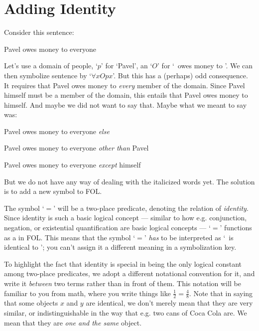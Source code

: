 \section{Adding Identity}\label{s:identity}


Consider this sentence:
\begin{earg}
\item[\ex{else1}] Pavel owes money to everyone
\end{earg}
Let's use a domain of people, `$p$' for `Pavel', an `$O$' for `\blank \ owes money to \blank'.   We can then symbolize sentence  by `$\forall x Opx$'. But this has a (perhaps) odd consequence. It requires that Pavel owes money to \emph{every} member of the domain.  Since Pavel himself must be a member of the domain, this entails that Pavel owes money to himself. And maybe we did not want to say that. Maybe what we meant to say was:
	\begin{earg}
		\item[\ex{else1b}] Pavel owes money to everyone \emph{else}
		\item[\ex{else1c}] Pavel owes money to everyone \emph{other than} Pavel
		\item[\ex{else1d}] Pavel owes money to everyone \emph{except} himself
	\end{earg}
But we do not have any way of dealing with the italicized words yet. The solution is to add a new symbol to FOL.

The symbol `$=$' will be a two-place predicate, denoting the relation of \emph{identity}. Since identity is such a basic logical concept --- similar to how e.g. conjunction, negation, or existential quantification are basic logical concepts --- `$=$'  functions as a  in FOL.  This means that the symbol `$=$'  \emph{has} to be interpreted as `\blank\ is identical to \blank'; you can't assign it a different meaning in a symbolization key.

To highlight the fact that identity is special in being the only logical constant among two-place predicates, we adopt a different notational convention for it, and write it \emph{between} two terms rather than in front of them.  This notation will be familiar to you from math, where you write things like $\frac{1}{2} = \frac{4}{8}$.  Note that in saying that some objects $x$ and $y$ are identical, we don't merely mean that they are very similar, or indistinguishable in the way that e.g. two cans of Coca Cola are.  We mean that they are \emph{one and the same} object.

